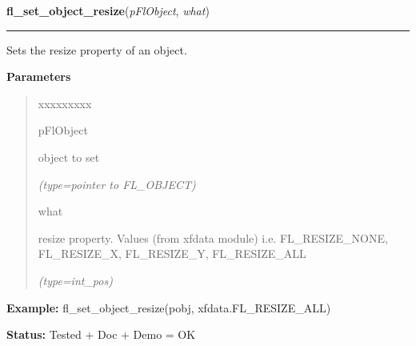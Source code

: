 \hspace{.8\funcindent}\begin{boxedminipage}{\funcwidth}

    \raggedright \textbf{fl\_set\_object\_resize}(\textit{pFlObject}, \textit{what})

    \vspace{-1.5ex}

    \rule{\textwidth}{0.5\fboxrule}
\setlength{\parskip}{2ex}
    Sets the resize property of an object.

\setlength{\parskip}{1ex}
      \textbf{Parameters}
      \vspace{-1ex}

      \begin{quote}
        \begin{Ventry}{xxxxxxxxx}

          \item[pFlObject]

          object to set

            {\it (type=pointer to FL\_OBJECT)}

          \item[what]

          resize property. Values (from xfdata module) i.e. 
          FL\_RESIZE\_NONE, FL\_RESIZE\_X, FL\_RESIZE\_Y, FL\_RESIZE\_ALL

            {\it (type=int\_pos)}

        \end{Ventry}

      \end{quote}

\textbf{Example:} fl\_set\_object\_resize(pobj, xfdata.FL\_RESIZE\_ALL)



\textbf{Status:} Tested + Doc + Demo = OK



    \end{boxedminipage}

    \label{xformslib:flbasic:fl_get_object_resize}

    \vspace{0.5ex}

